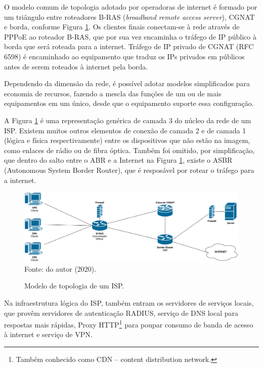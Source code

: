     O modelo comum de topologia adotado por operadoras de internet é formado por um triângulo entre roteadores B-RAS (\textit{broadband remote access server}), CGNAT e borda, conforme Figura \ref{fig:isp}. Os clientes finais conectam-se à rede através de PPPoE ao roteador B-RAS, que por sua vez encaminha o tráfego de IP público à borda que será roteada para a internet. Tráfego de IP privado de CGNAT (RFC 6598) é encaminhado ao equipamento que traduz os IPs privados em públicos antes de serem roteados à internet pela borda.
    
    Dependendo da dimensão da rede, é possível adotar modelos simplificados para economia de recursos, fazendo a mescla das funções de um ou de mais equipamentos em um único, desde que o equipamento suporte essa configuração.
    
    A Figura \ref{fig:isp} é uma representação genérica de camada 3 do núcleo da rede de um ISP. Existem muitos outros elementos de conexão de camada 2 e de camada 1 (lógica e física respectivamente) entre os dispositivos que não estão na imagem, como enlaces de rádio ou de fibra óptica. Também foi omitido, por simplificação, que dentro do salto entre o ABR e a Internet na Figura \ref{fig:isp}, existe o ASBR (Autonomous System Border Router), que é resposável por rotear o tráfego para a internet.
    
    \begin{figure}[!htb]
        \centering
        \caption{Modelo de topologia de um ISP.} 
        \label{fig:isp} 
        \includegraphics[width=0.9\linewidth]{img/isp.png} \\
        {\small Fonte: do autor (2020).} 
    \end{figure}
    
    Na infraestrutura lógica do ISP, também entram os servidores de serviços locais, que provêm servidores de autenticação RADIUS, serviço de DNS local para respostas mais rápidas, Proxy HTTP\footnote{Também conhecido como CDN -- content distribution network.} para poupar consumo de banda de acesso à internet e serviço de VPN.
    